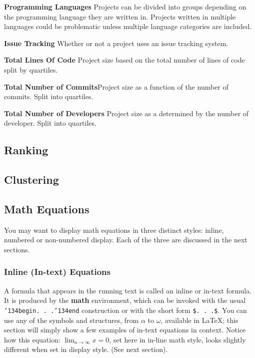 \documentclass{sig-alternate-05-2015}
\begin{document}
\textbf{Programming Languages} Projects can be divided into groups depending on the programming language they are written in. Projects written in multiple languages could be problematic unless multiple language categories are included.

\textbf{Issue Tracking} Whether or not a project uses an issue tracking system.

\textbf{Total Lines Of Code} Project size based on the total number of lines of code split by quartiles.

\textbf{Total Number of Commits}Project size as a function of the number of commits. Split into quartiles.

\textbf{Total Number of Developers} Project size as a determined by the number of developer. Split into quartiles.

\subsection{Ranking}

\subsection{Clustering}



\subsection{Math Equations}
You may want to display math equations in three distinct styles:
inline, numbered or non-numbered display.  Each of
the three are discussed in the next sections.

\subsubsection{Inline (In-text) Equations}
A formula that appears in the running text is called an
inline or in-text formula.  It is produced by the
\textbf{math} environment, which can be
invoked with the usual \texttt{{\char'134}begin. . .{\char'134}end}
construction or with the short form \texttt{\$. . .\$}. You
can use any of the symbols and structures,
from $\alpha$ to $\omega$, available in
\LaTeX\cite{Lamport:LaTeX}; this section will simply show a
few examples of in-text equations in context. Notice how
this equation: \begin{math}\lim_{n\rightarrow \infty}x=0\end{math},
set here in in-line math style, looks slightly different when
set in display style.  (See next section).
\end{document}
